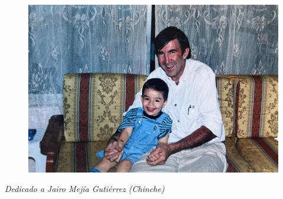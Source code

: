 \newpage
\thispagestyle{empty}

\vspace*{\fill}

\begin{figure}[!h] 
    \centering
    \includegraphics[width=1\linewidth]{imagenes/Chinche_y_yo.jpeg} 
\end{figure}

\vspace*{\fill}

\begin{flushright}
    \par
    \vspace{1.0 cm}
    \emph{Dedicado a Jairo Mejía Gutiérrez (Chinche)}
\end{flushright}